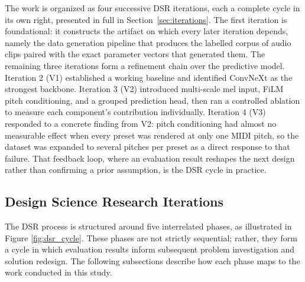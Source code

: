 \par \vspace{0.3cm}
\noindent
The work is organized as four successive DSR iterations, each a complete cycle in its own right, presented in full in Section~\ref{sec:iterations}. The first iteration is foundational: it constructs the artifact on which every later iteration depends, namely the data generation pipeline that produces the labelled corpus of audio clips paired with the exact parameter vectors that generated them. The remaining three iterations form a refinement chain over the predictive model. Iteration 2 (V1) established a working baseline and identified ConvNeXt as the strongest backbone. Iteration 3 (V2) introduced multi-scale mel input, FiLM pitch conditioning, and a grouped prediction head, then ran a controlled ablation to measure each component's contribution individually. Iteration 4 (V3) responded to a concrete finding from V2: pitch conditioning had almost no measurable effect when every preset was rendered at only one MIDI pitch, so the dataset was expanded to several pitches per preset as a direct response to that failure. That feedback loop, where an evaluation result reshapes the next design rather than confirming a prior assumption, is the DSR cycle in practice.

\subsection{Design Science Research Iterations}

The DSR process is structured around five interrelated phases, as illustrated in Figure \ref{fig:dsr_cycle}. These phases are not strictly sequential; rather, they form a cycle in which evaluation results inform subsequent problem investigation and solution redesign. The following subsections describe how each phase maps to the work conducted in this study.

